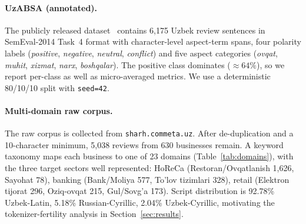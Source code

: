 \documentclass[runningheads]{llncs}
\begin{document}
\paragraph{UzABSA (annotated).} The publicly released
dataset~\cite{matlatipov2024uzabsa} contains 6{,}175 Uzbek review sentences
in SemEval-2014 Task~4 format with character-level aspect-term spans, four
polarity labels (\textit{positive}, \textit{negative}, \textit{neutral},
\textit{conflict}) and five aspect categories (\textit{ovqat},
\textit{muhit}, \textit{xizmat}, \textit{narx}, \textit{boshqalar}). The
positive class dominates ($\approx 64\%$), so we report per-class as well as
micro-averaged metrics. We use a deterministic 80/10/10 split with
\texttt{seed=42}.

\paragraph{Multi-domain raw corpus.} The raw corpus is collected from
\texttt{sharh.commeta.uz}. After de-duplication and a 10-character minimum,
5{,}038 reviews from 630 businesses remain. A keyword taxonomy maps each
business to one of 23 domains (Table~\ref{tab:domains}), with the three
target sectors well represented: HoReCa (Restoran/Ovqatlanish 1{,}626,
Sayohat 78), banking (Bank/Moliya 577, To'lov tizimlari 328), retail
(Elektron tijorat 296, Oziq-ovqat 215, Gul/Sovg'a 173). Script distribution
is 92.78\% Uzbek-Latin, 5.18\% Russian-Cyrillic, 2.04\% Uzbek-Cyrillic,
motivating the tokenizer-fertility analysis in Section~\ref{sec:results}.

\begin{table}[!htbp]
\centering
\caption{Top business domains in the multi-domain corpus
(5{,}038 reviews $\to$ 23 domains). Domains explicitly named in the
conference framing -- banking, retail, HoReCa -- are well represented.}
\label{tab:domains}
\renewcommand{\arraystretch}{1.1}
\setlength{\tabcolsep}{4pt}
\end{table}
\end{document}
